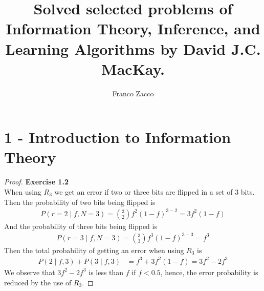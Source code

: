 \documentclass[11pt]{article}
\title{\textbf{Solved selected problems of Information Theory, Inference, and Learning Algorithms by David J.C. MacKay.}}
\author{Franco Zacco}
\date{}
\theoremstyle{definition}
\begin{document}
\maketitle
\thispagestyle{empty}

\section*{1 - Introduction to Information Theory}

\begin{proof}{\textbf{Exercise 1.2}}\\
When using $R_3$ we get an error if two or three bits are flipped in a set of
3 bits.
Then the probability of two bits being flipped is
\begin{align*}
    P(r=2\mid f, N=3) = \binom{3}{2}f^2(1 - f)^{3 - 2}
    = 3f^2(1 - f)
\end{align*}
And the probability of three bits being flipped is
\begin{align*}
    P(r=3 \mid f, N=3) = \binom{3}{3}f^3(1 - f)^{3 - 3}
    = f^3
\end{align*}
Then the total probability of getting an error when using $R_3$ is
\begin{align*}
    P(2\mid f, 3) + P(3 \mid f, 3) &= f^3 + 3f^2(1 - f)
    = 3f^2 - 2f^3
\end{align*}
We observe that $3f^2 - 2f^3$ is less than $f$ if $f < 0.5$, hence, the
error probability is reduced by the use of $R_3$.
\end{proof}
\end{document}
